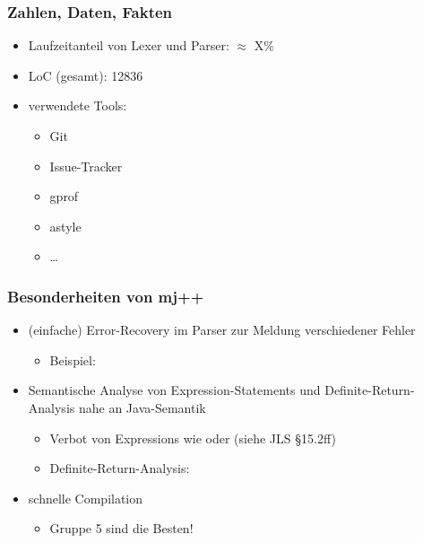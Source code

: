 \begin{frame}
	\frametitle{Zahlen, Daten, Fakten} %
	\begin{itemize}
		\item Laufzeitanteil von Lexer und Parser: $\approx$ X\%	%
		\item LoC (gesamt): 12836
		\item verwendete Tools: 
		\begin{itemize}
			\item Git
			\item Issue-Tracker
			\item gprof
			\item astyle
			\item \dots
		\end{itemize}
	\end{itemize}
\end{frame}

\begin{frame}
    \frametitle{Besonderheiten von mj++}
    \begin{itemize}
        \item (einfache) Error-Recovery im Parser zur Meldung verschiedener Fehler
        \begin{itemize}
        	\item Beispiel: \code{public static 12 [ void main...}
        \end{itemize} \pause
        \item Semantische Analyse von Expression-Statements und Definite-Return-Analysis nahe an Java-Semantik
        \begin{itemize}
        	\item Verbot von Expressions wie  oder  (siehe JLS §15.2ff)
        	\item Definite-Return-Analysis: 
        \end{itemize} \pause
        \item schnelle Compilation
            \pause
        \begin{itemize}
        \item Gruppe 5 sind die Besten!
        \end{itemize}
    \end{itemize}
\end{frame}